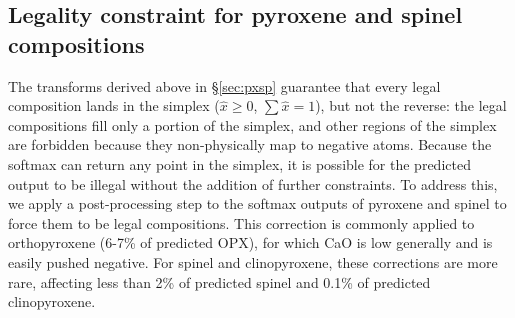 \subsection{Legality constraint for pyroxene and spinel compositions}
\label{sec:polish}

The transforms derived above in \S\ref{sec:pxsp} guarantee that every legal composition lands in the simplex 
($\hat x \ge 0$, $\sum\hat x = 1$), but not the reverse: the legal compositions fill only a portion
of the simplex, and other regions of the simplex are forbidden because they non-physically map to negative atoms. 
Because the softmax can return any point in the simplex, it is possible 
for the predicted output to be illegal without the addition of further constraints. To address this, 
we apply a post-processing step to the softmax outputs of pyroxene and spinel 
to force them to be legal compositions. This correction is commonly applied to orthopyroxene (6-7\% of predicted OPX), for which
CaO is low generally and is easily pushed negative. For spinel and clinopyroxene, these corrections are more rare, affecting less than 2\% 
of predicted spinel and 0.1\% of predicted clinopyroxene. 


